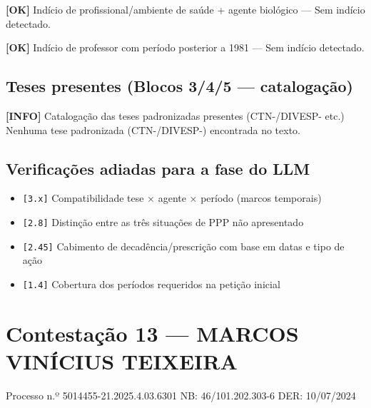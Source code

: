 \documentclass[12pt,a4paper]{article}
\newcommand{\statusOK}[1]{\textcolor{corOK}{\textbf{[OK]}} #1}
\newcommand{\statusINFO}[1]{\textcolor{corINFO}{\textbf{[INFO]}} #1}
\begin{document}
\medskip
\statusOK{Indício de profissional/ambiente de saúde + agente biológico} --- Sem indício detectado.

\medskip
\statusOK{Indício de professor com período posterior a 1981} --- Sem indício detectado.

\subsection{Teses presentes (Blocos 3/4/5 --- catalogação)}

\statusINFO{Catalogação das teses padronizadas presentes (CTN-/DIVESP- etc.)}\\
Nenhuma tese padronizada (CTN-/DIVESP-) encontrada no texto.

\subsection{Verificações adiadas para a fase do LLM}

\begin{itemize}
  \item \texttt{[3.x]} Compatibilidade tese × agente × período (marcos temporais)
  \item \texttt{[2.8]} Distinção entre as três situações de PPP não apresentado
  \item \texttt{[2.45]} Cabimento de decadência/prescrição com base em datas e tipo de ação
  \item \texttt{[1.4]} Cobertura dos períodos requeridos na petição inicial
\end{itemize}



\clearpage
{}
\section{Contestação 13 --- MARCOS VINÍCIUS TEIXEIRA}
\begin{center}
  {\small Processo n.º 5014455-21.2025.4.03.6301 \quad NB: 46/101.202.303-6 \quad DER: 10/07/2024}
\end{center}
\end{document}
